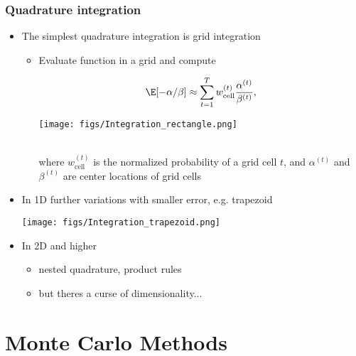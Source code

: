 \documentclass[10pt]{beamer}
\begin{document}
\begin{frame}

\frametitle{Quadrature integration}

  \begin{itemize}
  \item The simplest quadrature integration is grid integration
    \begin{itemize}
    \item Evaluate function in a grid and compute\\
    \hspace{-1cm}\begin{minipage}{4cm}
    \begin{align*}
      \E[-\alpha/\beta] \approx \sum_{t=1}^{T} w_{\mathrm{cell}}^{(t)} \frac{\alpha^{(t)}}{\beta^{(t)}},
    \end{align*}
  \end{minipage}
  \begin{minipage}{6cm}
  \texttt{[image: figs/Integration\_rectangle.png]}
\end{minipage}\\
where $w_{\mathrm{cell}}^{(t)}$ is the normalized probability of a grid cell $t$, and $\alpha^{(t)}$ and $\beta^{(t)}$ are center locations of grid cells
\end{itemize}
\item<2-> In 1D further variations with smaller error, e.g. trapezoid
  \begin{center}
    \texttt{[image: figs/Integration\_trapezoid.png]}
  \end{center}
\item<3-> In 2D and higher
  \begin{itemize}
  \item nested quadrature, product rules
  \item but theres a curse of dimensionality...
  \end{itemize}
  \end{itemize}


\end{frame}

\section{Monte Carlo Methods}
\frame{\sectionpage}
\end{document}
